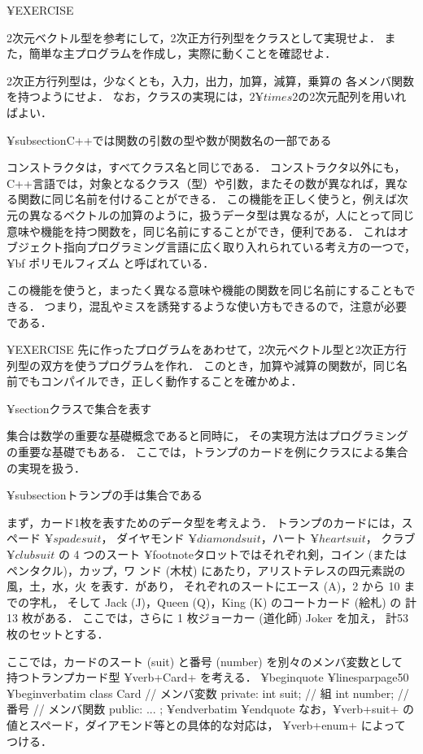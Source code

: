 {{{{{{}

¥EXERCISE{
2次元ベクトル型を参考にして，2次正方行列型をクラスとして実現せよ．
また，簡単な主プログラムを作成し，実際に動くことを確認せよ．

2次正方行列型は，少なくとも，入力，出力，加算，減算，乗算の
各メンバ関数を持つようにせよ．
なお，クラスの実現には，$2 ¥times 2$の2次元配列を用いればよい．

}


¥subsection{C++では関数の引数の型や数が関数名の一部である}

コンストラクタは，すべてクラス名と同じである．
コンストラクタ以外にも，C++言語では，対象となるクラス（型）や引数，またその数が異なれば，異なる関数に同じ名前を付けることができる．
この機能を正しく使うと，例えば次元の異なるベクトルの加算のように，扱うデータ型は異なるが，人にとって同じ意味や機能を持つ関数を，同じ名前にすることができ，便利である．
これはオブジェクト指向プログラミング言語に広く取り入れられている考え方の一つで，{¥bf ポリモルフィズム} と呼ばれている．

この機能を使うと，まったく異なる意味や機能の関数を同じ名前にすることもできる．
つまり，混乱やミスを誘発するような使い方もできるので，注意が必要である．

¥EXERCISE{
先に作ったプログラムをあわせて，2次元ベクトル型と2次正方行列型の双方を使うプログラムを作れ．
このとき，加算や減算の関数が，同じ名前でもコンパイルでき，正しく動作することを確かめよ．
}


¥section{クラスで集合を表す}

集合は数学の重要な基礎概念であると同時に，
その実現方法はプログラミングの重要な基礎でもある．
ここでは，トランプのカードを例にクラスによる集合の実現を扱う．

¥subsection{トランプの手は集合である}

まず，カード1枚を表すためのデータ型を考えよう．
トランプのカードには，スペード $¥spadesuit$，
ダイヤモンド $¥diamondsuit$，ハート $¥heartsuit$，
クラブ $¥clubsuit$ の 4 つのスート
¥footnote{タロットではそれぞれ剣，コイン (またはペンタクル)，カップ，ワ
ンド (木杖) にあたり，アリストテレスの四元素説の 風，土，水，火 を表す．}があり，
それぞれのスートにエース (A)，2 から 10 までの字札，
そして Jack (J)，Queen (Q)，King (K) のコートカード (絵札) の
計 13 枚がある．
ここでは，さらに 1 枚ジョーカー (道化師) Joker を加え，
計53枚のセットとする．

ここでは，カードのスート (suit) と番号 (number) を別々のメンバ変数として
持つトランプカード型 ¥verb+Card+ を考える．
¥begin{quote}
¥linesparpage{50}
¥begin{verbatim}
class Card {
// メンバ変数
private:
        int suit;       // 組
        int number;     // 番号
// メンバ関数
public:
        ...
};
¥end{verbatim}
¥end{quote}
なお，¥verb+suit+ の値とスペード，ダイアモンド等との具体的な対応は，
¥verb+enum+ によってつける．

}}}}}

